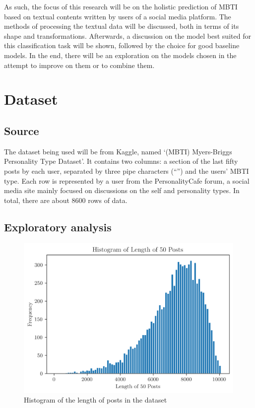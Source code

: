 \documentclass[11pt,a4paper]{article}
\begin{document}
	As such, the focus of this research will be on the holistic prediction of MBTI based on textual contents written by users of a social media platform. The methods of processing the textual data will be discussed, both in terms of its shape and transformations. Afterwards, a discussion on the model best suited for this classification task will be shown, followed by the choice for good baseline models. In the end, there will be an exploration on the models chosen in the attempt to improve on them or to combine them.
	
	\newpage
	\section{Dataset}
	
	\subsection{Source}

	The dataset being used will be from Kaggle, named `(MBTI) Myers-Briggs Personality Type Dataset'.\autocite{MBTIMyersBriggsPersonality} It contains two columns: a section of the last fifty posts by each user, separated by three pipe characters (“\textbar\textbar\textbar”) and the users' MBTI type. Each row is represented by a user from the PersonalityCafe forum, a social media site mainly focused on discussions on the self and personality types. In total, there are about 8600 rows of data.
	
	\subsection{Exploratory analysis}
	
	\begin{figure}[h!]
		\centering
		
		\includegraphics[height=8cm]{../output/visualisations/histogram_len_post}
		
		\caption{Histogram of the length of posts in the dataset}
		
	\end{figure}
	
\end{document}
